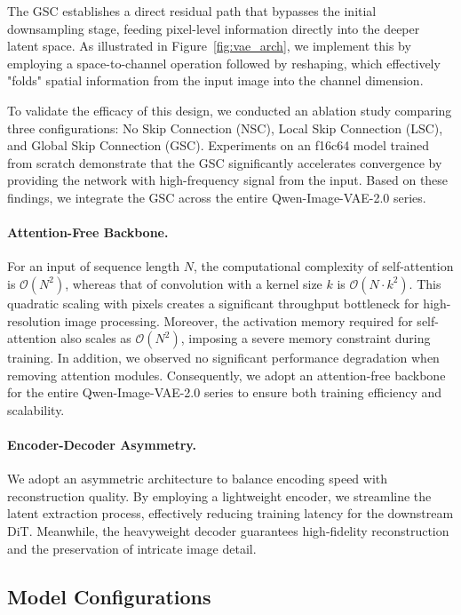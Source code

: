 \documentclass{llmxive}
\begin{document}
The GSC establishes a direct residual path that bypasses the initial downsampling stage, feeding pixel-level information directly into the deeper latent space. As illustrated in Figure~\ref{fig:vae_arch}, we implement this by employing a space-to-channel operation followed by reshaping, which effectively "folds" spatial information from the input image into the channel dimension.

To validate the efficacy of this design, we conducted an ablation study comparing three configurations: No Skip Connection (NSC), Local Skip Connection (LSC), and Global Skip Connection (GSC). Experiments on an f16c64 model trained from scratch demonstrate that the GSC significantly accelerates convergence by providing the network with high-frequency signal from the input. Based on these findings, we integrate the GSC across the entire Qwen-Image-VAE-2.0 series.



\paragraph{Attention-Free Backbone.} 
For an input of sequence length $N$, the computational complexity of self-attention is $\mathcal{O}(N^2)$, whereas that of convolution with a kernel size $k$ is $\mathcal{O}(N \cdot k^2)$. This quadratic scaling with pixels creates a significant throughput bottleneck for high-resolution image processing. Moreover, the activation memory required for self-attention also scales as $\mathcal{O}(N^2)$, imposing a severe memory constraint during training. In addition, we observed no significant performance degradation when removing attention modules. Consequently, we adopt an attention-free backbone for the entire Qwen-Image-VAE-2.0 series to ensure both training efficiency and scalability.

\paragraph{Encoder-Decoder Asymmetry.} 
We adopt an asymmetric architecture to balance encoding speed with reconstruction quality. By employing a lightweight encoder, we streamline the latent extraction process, effectively reducing training latency for the downstream DiT. Meanwhile, the heavyweight decoder guarantees high-fidelity reconstruction and the preservation of intricate image detail.

\subsection{Model Configurations}
\end{document}
